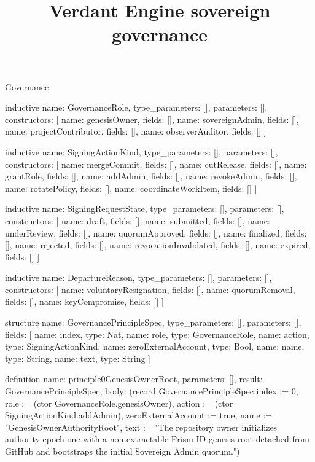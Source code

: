 \begin{lexlean}{Governance}
\title{Verdant Engine sovereign governance}
\begin{semanticmodule}
inductive{
  name: GovernanceRole,
  type_parameters: [],
  parameters: [],
  constructors: [
    {name: genesisOwner, fields: []},
    {name: sovereignAdmin, fields: []},
    {name: projectContributor, fields: []},
    {name: observerAuditor, fields: []}
  ]
}

inductive{
  name: SigningActionKind,
  type_parameters: [],
  parameters: [],
  constructors: [
    {name: mergeCommit, fields: []},
    {name: cutRelease, fields: []},
    {name: grantRole, fields: []},
    {name: addAdmin, fields: []},
    {name: revokeAdmin, fields: []},
    {name: rotatePolicy, fields: []},
    {name: coordinateWorkItem, fields: []}
  ]
}

inductive{
  name: SigningRequestState,
  type_parameters: [],
  parameters: [],
  constructors: [
    {name: draft, fields: []},
    {name: submitted, fields: []},
    {name: underReview, fields: []},
    {name: quorumApproved, fields: []},
    {name: finalized, fields: []},
    {name: rejected, fields: []},
    {name: revocationInvalidated, fields: []},
    {name: expired, fields: []}
  ]
}

inductive{
  name: DepartureReason,
  type_parameters: [],
  parameters: [],
  constructors: [
    {name: voluntaryResignation, fields: []},
    {name: quorumRemoval, fields: []},
    {name: keyCompromise, fields: []}
  ]
}

structure{
  name: GovernancePrincipleSpec,
  type_parameters: [],
  parameters: [],
  fields: [
    {name: index, type: Nat},
    {name: role, type: GovernanceRole},
    {name: action, type: SigningActionKind},
    {name: zeroExternalAccount, type: Bool},
    {name: name, type: String},
    {name: text, type: String}
  ]
}

definition{
  name: principle0GenesisOwnerRoot,
  parameters: [],
  result: GovernancePrincipleSpec,
  body: (record GovernancePrincipleSpec {index := 0, role := (ctor GovernanceRole.genesisOwner), action := (ctor SigningActionKind.addAdmin), zeroExternalAccount := true, name := "GenesisOwnerAuthorityRoot", text := "The repository owner initializes authority epoch one with a non-extractable Prism ID genesis root detached from GitHub and bootstraps the initial Sovereign Admin quorum."})
}


\end{semanticmodule}
\end{lexlean}
